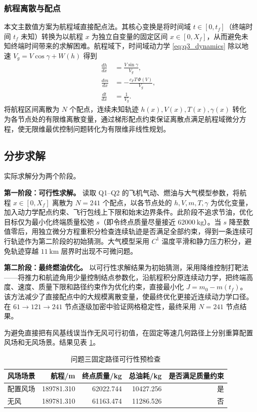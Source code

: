 \documentclass[withoutpreface,bwprint]{cumcmthesis}
\begin{document}
\subsubsection{航程离散与配点}

本文主数值方案为航程域直接配点法。其核心变换是将时间域 $t\in[0,t_f]$（终端时间 $t_f$ 未知）转换为以航程 $x$ 为独立自变量的固定区间 $x\in[0,X_f]$，从而避免未知终端时间带来的求解困难。航程域下，时间域动力学 \eqref{eq:q3_dynamics} 除以地速 $V_g=V\cos\gamma+W(h)$ 得到
\begin{align}
\frac{dh}{dx} &= \frac{V\sin\gamma}{V_g},\\
\frac{dm}{dx} &= -\frac{c_F T\,\Phi(V)}{V_g},\\
\frac{dt}{dx} &= \frac{1}{V_g}.
\end{align}
将航程区间离散为 $N$ 个配点，连续未知轨迹 $h(x),V(x),T(x),\gamma(x)$ 转化为各节点处的有限维离散变量，通过梯形配点约束保证离散点满足航程域微分方程，使无限维最优控制问题转化为有限维非线性规划\cite{jia2024}。


\subsection{分步求解}

实际求解分为两个阶段。

\textbf{第一阶段：可行性求解。} 读取 Q1--Q2 的飞机气动、燃油与大气模型参数，将航程 $x\in[0,X_f]$ 离散为 $N=241$ 个配点，以各节点处的 $h,V,m,T,\gamma$ 为优化变量，加入动力学配点约束、飞行包线上下限和始末边界条件。此阶段不追求节油，优化目标仅为最小化终端质量松弛 $s$（即令终点质量尽量接近 $62000\ \mathrm{kg}$）。当 $s$ 降至数值零后，用独立微分方程重积分检查连续轨迹是否满足全部约束，得到一条连续可行轨迹作为第二阶段的初始猜测。大气模型采用 $C^1$ 温度平滑和静力压力积分，避免轨迹穿越 $11\ \mathrm{km}$ 层界时出现不可微问题。

\textbf{第二阶段：最终燃油优化。} 以可行性求解结果为初始猜测，采用降维控制打靶法——将推力和航迹角用少量控制结点参数化，沿航程积分原连续动力学，把终端高度、速度、质量下限和路径约束作为优化约束，直接最小化 $J=m_0-m(t_f)$。该方法减少了直接配点中的大规模离散变量，使最终优化更接近连续动力学口径。在 $61\to121\to241$ 节点逐级加密中验证网格稳定性，最终采用 $N=241$ 节点结果。

为避免直接把有风基线误当作无风可行初值，在固定等速几何路径上分别重算配置风场和无风场景。结果见表 \ref{tab:q3_baseline_feasibility}。


\begin{table}[htbp]
\centering
\caption{问题三固定路径可行性预检查}
\label{tab:q3_baseline_feasibility}
\begin{tabular}{lrrrr}\toprule
风场场景 & 航程/m & 终点质量/kg & 总油耗/kg & 是否满足质量约束 \\
\midrule
配置风场 & 189781.310 & 62022.744 & 10427.256 & 是 \\
无风 & 189781.310 & 61163.474 & 11286.526 & 否 \\
\bottomrule
\end{tabular}
\end{table}
\end{document}
